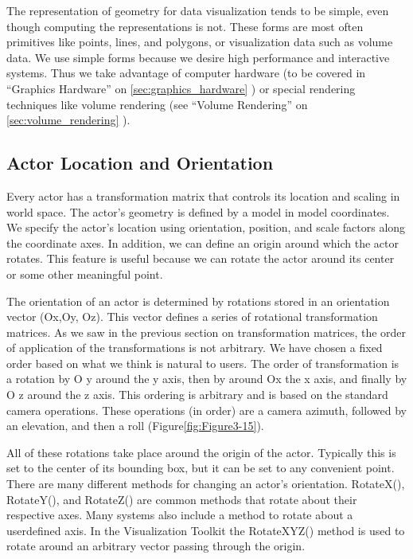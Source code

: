 The representation of geometry for data visualization tends to be simple, even though computing the representations is not. These forms are most often primitives like points, lines, and polygons, or visualization data such as volume data. We use simple forms because we desire high performance and interactive systems. Thus we take advantage of computer hardware (to be covered in ``Graphics Hardware'' on \ref{sec:graphics_hardware} ) or special rendering techniques like volume rendering (see ``Volume Rendering'' on \ref{sec:volume_rendering} ).

\subsection{Actor Location and Orientation}

Every actor has a transformation matrix that controls its location and scaling in world space. The actor's geometry is defined by a model in model coordinates. We specify the actor's location using orientation, position, and scale factors along the coordinate axes. In addition, we can define an origin around which the actor rotates. This feature is useful because we can rotate the actor around its center or some other meaningful point.

The orientation of an actor is determined by rotations stored in an orientation vector (Ox,Oy, Oz). This vector defines a series of rotational transformation matrices. As we saw in the previous section on transformation matrices, the order of application of the transformations is not arbitrary. We have chosen a fixed order based on what we think is natural to users. The order of transformation is a rotation by O y around the y axis, then by around Ox the x axis, and finally by O z around the z axis. This ordering is arbitrary and is based on the standard camera operations. These operations (in order) are a camera azimuth, followed by an elevation, and then a roll (Figure\ref{fig:Figure3-15}).

All of these rotations take place around the origin of the actor. Typically this is set to the center of its bounding box, but it can be set to any convenient point. There are many different methods for changing an actor's orientation. RotateX(), RotateY(), and RotateZ() are common methods that rotate about their respective axes. Many systems also include a method to rotate about a userdefined axis. In the Visualization Toolkit the RotateXYZ() method is used to rotate around an arbitrary vector passing through the origin.

